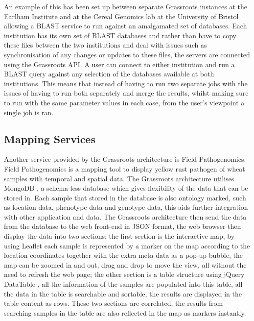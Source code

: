 \documentclass[9pt,a4paper]{extarticle}
\begin{document}
An example of this has been set up between separate Grassroots instances at the Earlham Institute and at the Cereal Genomics lab at the University of Bristol allowing a BLAST service to run against an amalgamated set of databases. 
Each institution has its own set of BLAST databases and rather than have to copy these files between the two institutions and deal with issues such as synchronisation of any changes or updates to these files, the servers are connected using the Grassroots API. A user can connect to either institution and run a BLAST query against any selection of the databases available at both institutions. 
This means that instead of having to run two separate jobs with the issues of having to run both separately and merge the results, whilst making sure to run with the same parameter values in each case, from the user's viewpoint a single job is ran.


\subsection*{Mapping Services}

Another service provided by the Grassroots architecture is Field Pathogenomics. Field Pathogenomics is a mapping tool to display yellow rust pathogen of wheat samples with temporal and spatial data. The Grassroots architecture utilises MongoDB \cite{mongodb}, a schema-less database which gives flexibility of the data that can be stored in. Each sample that stored in the database is also ontology marked, such as location data, phenotype data and genotype data, this aids further integration with other application and data. The Grassroots architecture then send the data from the database to the web front-end in JSON format, the web browser then display the data into two sections: the first section is the interactive map, by using Leaflet \cite{leaflet} each sample is represented by a marker on the map according to the location coordinates together with the extra meta-data as a pop-up bubble, the map can be zoomed in and out, drag and drop to move the view, all without the need to refresh the web page; the other section is a table structure using jQuery \cite{jquery} DataTable \cite{datatable}, all the information of the samples are populated into this table, all the data in the table is searchable and sortable, the results are displayed in the table content as rows. These two sections are correlated, the results from searching samples in the table are also reflected in the map as markers instantly.
\end{document}
